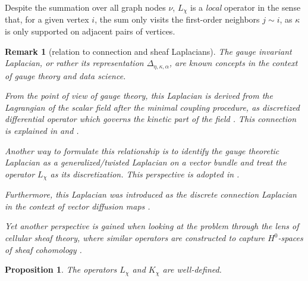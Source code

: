 \documentclass[10pt,reqno]{amsart}
\numberwithin{equation}{section}
\theoremstyle{bfnote}
\newtheorem{proposition}[theorem]{Proposition}
\theoremstyle{bfdef}
\newtheorem{remark}[theorem]{Remark}
\providecommand\hgen; %
\renewcommand{\hgen}{L}
\providecommand\vg; %
\renewcommand{\vg}{\chi}
\begin{document}
		Despite the summation over all graph nodes $\nu$, $\hgen_{\vg}$ is a \textit{local} operator in the sense that, for a given vertex $i$, the sum only visits the first-order neighbors $j\sim i$, as $\kappa$ is only supported on adjacent pairs of vertices.

		\begin{remark}[relation to connection and sheaf Laplacians]\label{rem:laplacian-relations}
			The gauge invariant Laplacian, or rather its representation $\Delta_{\eta,\kappa,\alpha}$, are known concepts in the context of gauge theory and data science.

			From the point of view of gauge theory, this Laplacian is derived from the Lagrangian of the scalar field after the minimal coupling procedure, as discretized differential operator which governs the kinetic part of the field \cite{hamiltonMathematicalGaugeTheory2017}. This connection is explained in \cite[Section 4]{tong2018gauge} and \cite{rotheLatticeGaugeTheories2012}.

			Another way to formulate this relationship is to identify the gauge theoretic Laplacian as a \textit{generalized/twisted Laplacian} on a vector bundle \cite{Berline:1996aa} and treat the operator $L_{\chi}$ as its discretization. This perspective is adopted in \cite{gaoGeometrySynchronizationProblems2019}.

			Furthermore, this Laplacian was introduced as the \textit{discrete connection Laplacian} in the context of \textit{vector diffusion maps} \cite{Singer:2012aa}.

			Yet another perspective is gained when looking at the problem through the lens of \textit{cellular sheaf theory}, where similar operators are constructed to capture $H^{0}$-spaces of sheaf cohomology \cite{hansenSpectralTheoryCellular2019a,bodnarNeuralSheafDiffusion2023}.
		\end{remark}

		\begin{proposition}
			The operators $\hgen_{\vg}$ and $K_{\vg}$ are well-defined.
		\end{proposition}
\end{document}
